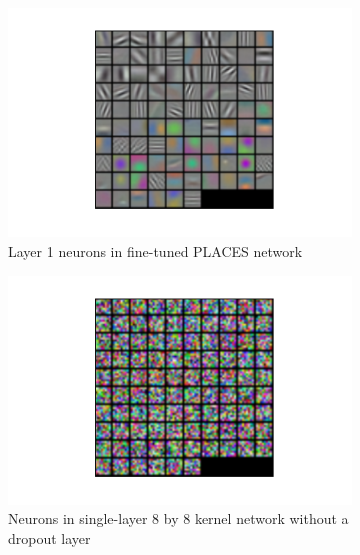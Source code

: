 \documentclass[10pt]{article}
\begin{document}
\begin{figure}[!ht]
\centering
\begin{subfigure}[t]{0.32\textwidth}
	\centering
	\includegraphics[width=\textwidth]{places205_finetune_layer1.pdf}
	\caption{Layer 1 neurons in fine-tuned PLACES network}
	\label{fig:places}
\end{subfigure}
\begin{subfigure}[t]{0.32\textwidth}
	\centering
	\includegraphics[width=\textwidth]{8_kernel_1_pool_5000_step_iter_50000.pdf}
	\caption{Neurons in single-layer 8 by 8 kernel network without a dropout layer}
	\label{fig:8nodropoff}
\end{subfigure}
\begin{subfigure}[t]{0.32\textwidth}
	\centering

\end{subfigure}
\end{figure}
\end{document}
